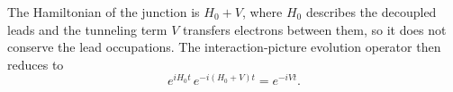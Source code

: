 \documentclass{article}
\begin{document}
The Hamiltonian of the junction is $H_0 + V$, where $H_0$ describes the decoupled leads and the
tunneling term $V$ transfers electrons between them, so it does not conserve the lead occupations.
The interaction-picture evolution operator then reduces to
\begin{equation}
e^{i H_0 t}\,e^{-i(H_0+V)t} = e^{-i V t} .
\label{eq:ui}
\end{equation}
\end{document}
